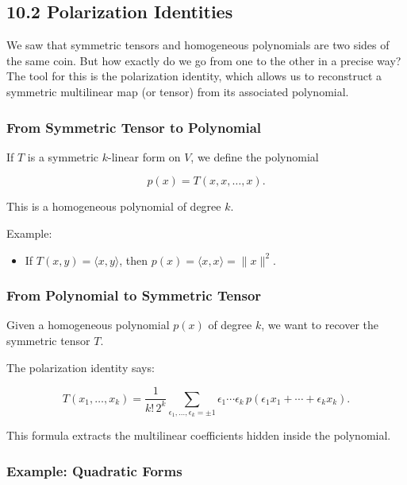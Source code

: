 \documentclass[
  letterpaper,
  DIV=11,
  numbers=noendperiod]{scrreprt}
\providecommand{\tightlist}{%
  \setlength{\itemsep}{0pt}\setlength{\parskip}{0pt}}
\begin{document}
\subsection{10.2 Polarization Identities}\label{polarization-identities}

We saw that symmetric tensors and homogeneous polynomials are two sides
of the same coin. But how exactly do we go from one to the other in a
precise way? The tool for this is the polarization identity, which
allows us to reconstruct a symmetric multilinear map (or tensor) from
its associated polynomial.

\subsubsection{From Symmetric Tensor to
Polynomial}\label{from-symmetric-tensor-to-polynomial-1}

If \(T\) is a symmetric \(k\)-linear form on \(V\), we define the
polynomial

\[
p(x) = T(x,x,\dots,x).
\]

This is a homogeneous polynomial of degree \(k\).

Example:

\begin{itemize}
\tightlist
\item
  If \(T(x,y) = \langle x,y \rangle\), then
  \(p(x) = \langle x,x \rangle = \|x\|^2\).
\end{itemize}

\subsubsection{From Polynomial to Symmetric
Tensor}\label{from-polynomial-to-symmetric-tensor-1}

Given a homogeneous polynomial \(p(x)\) of degree \(k\), we want to
recover the symmetric tensor \(T\).

The polarization identity says:

\[
T(x_1, \dots, x_k) = \frac{1}{k! \, 2^k} \sum_{\epsilon_1,\dots,\epsilon_k = \pm 1} \epsilon_1 \cdots \epsilon_k \, p(\epsilon_1 x_1 + \cdots + \epsilon_k x_k).
\]

This formula extracts the multilinear coefficients hidden inside the
polynomial.

\subsubsection{Example: Quadratic
Forms}\label{example-quadratic-forms-1}
\end{document}
